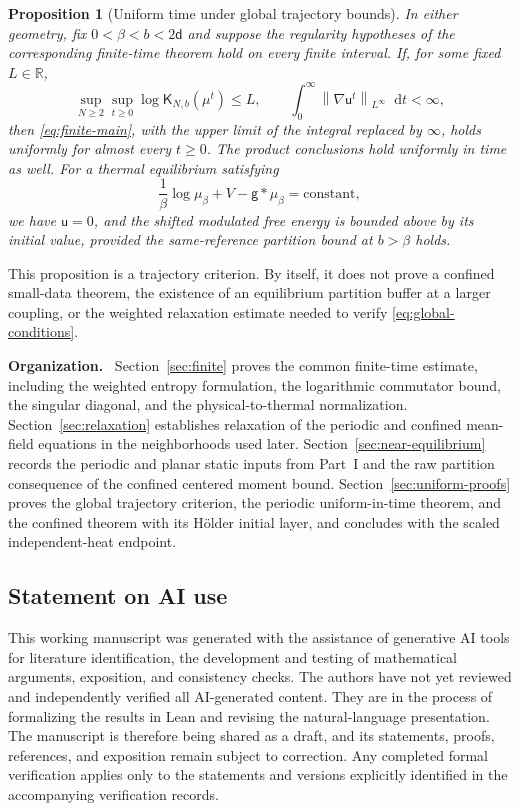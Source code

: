 \documentclass[11pt,reqno]{amsart}
\numberwithin{equation}{section}
\newtheorem{proposition}[proposition]{Proposition}
\theoremstyle{definition}
\theoremstyle{remark}
\newcommand{\R}{\mathbb R}
\newcommand{\g}{\mathsf g}
\renewcommand{\d}{\mathsf d}
\newcommand{\K}{\mathsf K}
\renewcommand{\u}{\mathsf u}
\newcommand{\dd}{\mathop{}\!\mathrm d}
\newcommand{\norm}[1]{\left\lVert#1\right\rVert}
\newcommand{\parhead}[1]{\par\medskip\noindent\textbf{#1.}\ }
\newcommand{\revision}[1]{{\ifdefined\MarkedRevision\color{red}\fi#1}}
\begin{document}
\begin{proposition}[Uniform time under global trajectory bounds]\label{prop:uniform-criterion}
In either geometry, fix $0<\beta<b<2\d$ and suppose the regularity hypotheses of the corresponding finite-time theorem hold on every finite interval. If, for some fixed $L\in\R$,
\begin{equation}\label{eq:global-conditions}
 \sup_{N\geq2}\sup_{t\geq0}\log \K_{N,b}(\mu^t)\leq L,
 \qquad \int_0^\infty\norm{\nabla \u^t}_{L^\infty}\dd t<\infty,
\end{equation}
then \eqref{eq:finite-main}, with the upper limit of the integral replaced by $\infty$, holds uniformly for almost every $t\geq0$. The product conclusions hold uniformly in time as well. For a thermal equilibrium satisfying
\begin{equation}\label{eq:thermal-equilibrium}
 \frac1\beta\log\mu_\beta+V-\g*\mu_\beta=\text{constant},
\end{equation}
we have $\u=0$, and the shifted modulated free energy is bounded above by its initial value, provided the same-reference partition bound at $b>\beta$ holds.
\end{proposition}

This proposition is a trajectory criterion. By itself, it does not prove a confined small-data theorem, the existence of an equilibrium partition buffer at a larger coupling, or the weighted relaxation estimate needed to verify \eqref{eq:global-conditions}.

\parhead{Organization}
Section~\ref{sec:finite} proves the common finite-time estimate, including the weighted entropy formulation, the logarithmic commutator bound, the singular diagonal, and the physical-to-thermal normalization. Section~\ref{sec:relaxation} establishes relaxation of the periodic and confined mean-field equations in the neighborhoods used later. Section~\ref{sec:near-equilibrium} records the periodic and planar static inputs from Part~I and the raw partition consequence of the confined centered moment bound. \revision{Section~\ref{sec:uniform-proofs} proves the global trajectory criterion, the periodic uniform-in-time theorem, and the confined theorem with its H\"older initial layer, and concludes with the scaled independent-heat endpoint.}

\subsection*{Statement on AI use}

This working manuscript was generated with the assistance of generative AI tools for literature identification, the development and testing of mathematical arguments, exposition, and consistency checks. The authors have not yet reviewed and independently verified all AI-generated content. They are in the process of formalizing the results in Lean and revising the natural-language presentation. The manuscript is therefore being shared as a draft, and its statements, proofs, references, and exposition remain subject to correction. Any completed formal verification applies only to the statements and versions explicitly identified in the accompanying verification records.
\end{document}
